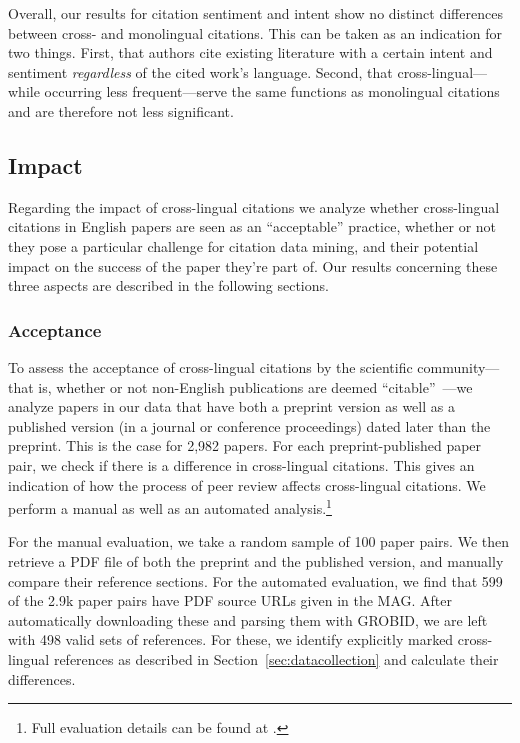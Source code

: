 Overall, our results for citation sentiment and intent show no distinct differences between cross- and monolingual citations. This can be taken as an indication for two things. First, that authors cite existing literature with a certain intent and sentiment \emph{regardless} of the cited work's language. Second, that cross-lingual---while occurring less frequent---serve the same functions as monolingual citations and are therefore not less significant.


\subsection{Impact}
Regarding the impact of cross-lingual citations we analyze whether cross-lingual citations in English papers are seen as an ``acceptable'' practice, whether or not they pose a particular challenge for citation data mining, and their potential impact on the success of the paper they're part of. Our results concerning these three aspects are described in the following sections.

\subsubsection{Acceptance}

To assess the acceptance of cross-lingual citations by the scientific community---that is, whether or not non-English publications are deemed ``citable''~\cite{Lillis2010}---we analyze papers in our data that have both a preprint version as well as a published version (in a journal or conference proceedings) dated later than the preprint. This is the case for 2,982 papers. For each preprint-published paper pair, we check if there is a difference in cross-lingual citations. This gives an indication of how the process of peer review affects cross-lingual citations.
We perform a manual as well as an automated analysis.\footnote{Full evaluation details can be found at .}

For the manual evaluation, we take a random sample of 100 paper pairs. We then retrieve a PDF file of both the preprint and the published version, and manually compare their reference sections. For the automated evaluation, we find that 599 of the 2.9k paper pairs have PDF source URLs given in the MAG. After automatically downloading these and parsing them with GROBID, we are left with 498 valid sets of references. For these, we identify explicitly marked cross-lingual references as described in Section~\ref{sec:datacollection} and calculate their differences.

